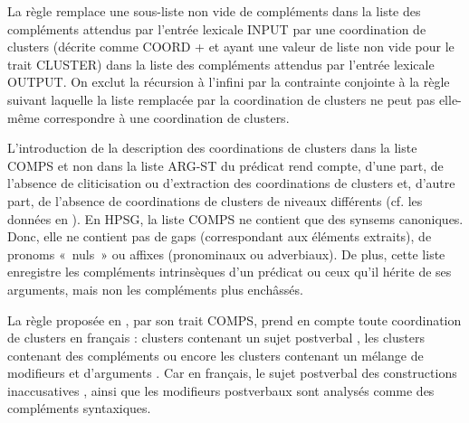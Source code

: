 
\z

La règle remplace une sous-liste non vide de compléments  dans la liste des compléments attendus par l’entrée lexicale INPUT par une coordination de clusters (décrite comme COORD + et ayant une valeur de liste non vide pour le trait CLUSTER) dans la liste des compléments attendus par l’entrée lexicale OUTPUT. On exclut la récursion à l’infini par la contrainte conjointe à la règle suivant laquelle la liste  remplacée par la coordination de clusters ne peut pas elle-même correspondre à une coordination de clusters.

L’introduction de la description des coordinations de clusters dans la liste COMPS et non dans la liste ARG-ST du prédicat rend compte, d’une part, de l’absence de cliticisation ou d’extraction des coordinations de clusters et, d’autre part, de l’absence de coordinations de clusters de niveaux différents (cf. les données en ). En HPSG, la liste COMPS ne contient que des synsems canoniques. Donc, elle ne contient pas de gaps (correspondant aux éléments extraits), de pronoms «~nuls~» ou affixes (pronominaux ou adverbiaux). De plus, cette liste enregistre les compléments intrinsèques d’un prédicat ou ceux qu’il hérite de ses arguments, mais non les compléments plus enchâssés. 

La règle proposée en , par son trait COMPS, prend en compte toute coordination de clusters en français : clusters contenant un sujet postverbal , les clusters contenant des compléments  ou encore les clusters contenant un mélange de modifieurs et d’arguments . Car en français, le sujet postverbal des constructions inaccusatives \citep{Marandin1999}, ainsi que les modifieurs postverbaux \citep{Mouret2007} sont analysés comme des compléments syntaxiques. 

